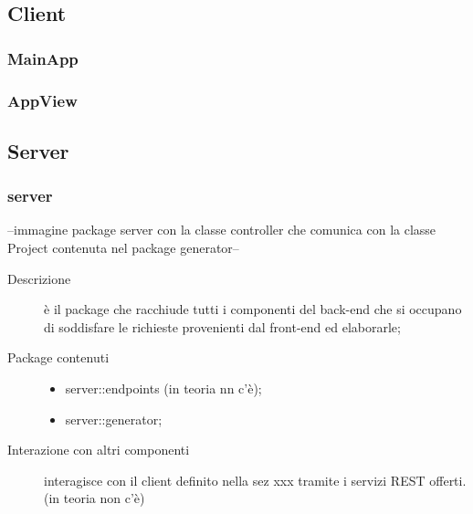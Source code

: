 





\subsection{Client}

\subsubsection{MainApp}

\subsubsection{AppView}




\subsection{Server}
\subsubsection{server}
--immagine package server con la classe controller che comunica con la classe Project contenuta nel package generator--
\begin{description}
\item[Descrizione] è il package che racchiude tutti i componenti del back-end che si occupano di soddisfare le richieste provenienti dal front-end ed elaborarle;
\item[Package contenuti] 
	\begin{itemize}
	\item server::endpoints (in teoria nn c'è);
	\item server::generator;
	\end{itemize}
\item[Interazione con altri componenti] interagisce con il client definito nella sez xxx tramite i servizi REST offerti. (in teoria non c'è)
\end{description}


